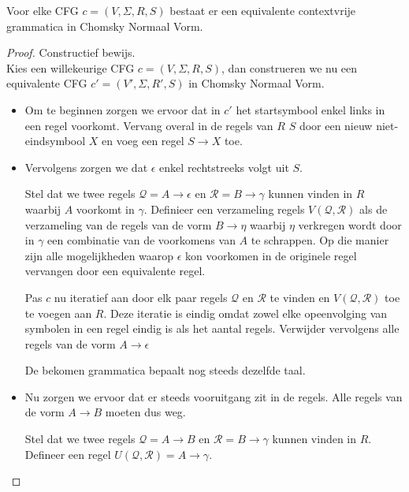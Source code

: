 \documentclass[main.tex]{subfiles}
\begin{document}
\begin{st}
  \label{st:constructie-chomsky-normaalvorm}
  Voor elke CFG $c = (V,\Sigma,R,S)$ bestaat er een equivalente contextvrije grammatica in Chomsky Normaal Vorm.

  \begin{proof}
    Constructief bewijs.\\
    Kies een willekeurige CFG $c = (V,\Sigma,R,S)$, dan construeren we nu een equivalente CFG $c' = (V',\Sigma,R',S)$ in Chomsky Normaal Vorm.

    \begin{itemize}
    \item Om te beginnen zorgen we ervoor dat in $c'$ het startsymbool enkel links in een regel voorkomt.
      Vervang overal in de regels van $R$ $S$ door een nieuw niet-eindsymbool $X$ en voeg een regel $S\rightarrow X$ toe.
    \item Vervolgens zorgen we dat $\epsilon$ enkel rechtstreeks volgt uit $S$.

      Stel dat we twee regels $\mathcal{Q} = A \rightarrow \epsilon$ en $\mathcal{R} = B \rightarrow \gamma$ kunnen vinden in $R$ waarbij $A$ voorkomt in $\gamma$.
      Definieer een verzameling regels $V(\mathcal{Q},\mathcal{R})$ als de verzameling van de regels van de vorm $B\rightarrow \eta$ waarbij $\eta$ verkregen wordt door in $\gamma$ een combinatie van de voorkomens van $A$ te schrappen.
      Op die manier zijn alle mogelijkheden waarop $\epsilon$ kon voorkomen in de originele regel vervangen door een equivalente regel.

      Pas $c$ nu iteratief aan door elk paar regels $\mathcal{Q}$ en $\mathcal{R}$ te vinden en $V(\mathcal{Q},\mathcal{R})$ toe te voegen aan $R$.
      Deze iteratie is eindig omdat zowel elke opeenvolging van symbolen in een regel eindig is als het aantal regels.
      Verwijder vervolgens alle regels van de vorm $A\rightarrow \epsilon$
      
      De bekomen grammatica bepaalt nog steeds dezelfde taal.

    \item Nu zorgen we ervoor dat er steeds vooruitgang zit in de regels.
      Alle regels van de vorm $A\rightarrow B$ moeten dus weg.

      Stel dat we twee regels $\mathcal{Q} = A \rightarrow B$ en $\mathcal{R} = B \rightarrow \gamma$ kunnen vinden in $R$.
      Defineer een regel $U(\mathcal{Q},\mathcal{R}) = A \rightarrow \gamma$.


\end{itemize}
\end{proof}
\end{st}
\end{document}
